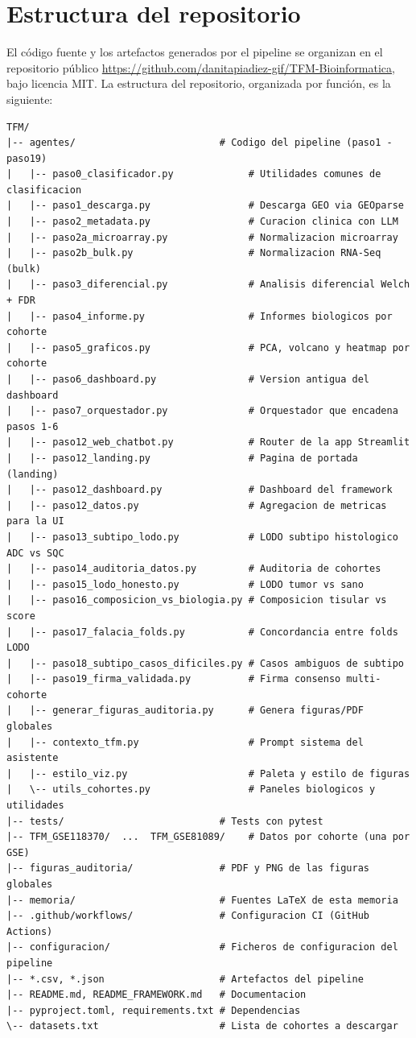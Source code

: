 \chapter{Estructura del repositorio}
\label{anexo:repo}

El código fuente y los artefactos generados por el pipeline se organizan
en el repositorio público
\url{https://github.com/danitapiadiez-gif/TFM-Bioinformatica}, bajo
licencia MIT. La estructura del repositorio, organizada por función, es
la siguiente:

\begin{lstlisting}[style=bash, caption={Estructura completa del repositorio.}]
TFM/
|-- agentes/                         # Codigo del pipeline (paso1 - paso19)
|   |-- paso0_clasificador.py             # Utilidades comunes de clasificacion
|   |-- paso1_descarga.py                 # Descarga GEO via GEOparse
|   |-- paso2_metadata.py                 # Curacion clinica con LLM
|   |-- paso2a_microarray.py              # Normalizacion microarray
|   |-- paso2b_bulk.py                    # Normalizacion RNA-Seq (bulk)
|   |-- paso3_diferencial.py              # Analisis diferencial Welch + FDR
|   |-- paso4_informe.py                  # Informes biologicos por cohorte
|   |-- paso5_graficos.py                 # PCA, volcano y heatmap por cohorte
|   |-- paso6_dashboard.py                # Version antigua del dashboard
|   |-- paso7_orquestador.py              # Orquestador que encadena pasos 1-6
|   |-- paso12_web_chatbot.py             # Router de la app Streamlit
|   |-- paso12_landing.py                 # Pagina de portada (landing)
|   |-- paso12_dashboard.py               # Dashboard del framework
|   |-- paso12_datos.py                   # Agregacion de metricas para la UI
|   |-- paso13_subtipo_lodo.py            # LODO subtipo histologico ADC vs SQC
|   |-- paso14_auditoria_datos.py         # Auditoria de cohortes
|   |-- paso15_lodo_honesto.py            # LODO tumor vs sano
|   |-- paso16_composicion_vs_biologia.py # Composicion tisular vs score
|   |-- paso17_falacia_folds.py           # Concordancia entre folds LODO
|   |-- paso18_subtipo_casos_dificiles.py # Casos ambiguos de subtipo
|   |-- paso19_firma_validada.py          # Firma consenso multi-cohorte
|   |-- generar_figuras_auditoria.py      # Genera figuras/PDF globales
|   |-- contexto_tfm.py                   # Prompt sistema del asistente
|   |-- estilo_viz.py                     # Paleta y estilo de figuras
|   \-- utils_cohortes.py                 # Paneles biologicos y utilidades
|-- tests/                           # Tests con pytest
|-- TFM_GSE118370/  ...  TFM_GSE81089/    # Datos por cohorte (una por GSE)
|-- figuras_auditoria/               # PDF y PNG de las figuras globales
|-- memoria/                         # Fuentes LaTeX de esta memoria
|-- .github/workflows/               # Configuracion CI (GitHub Actions)
|-- configuracion/                   # Ficheros de configuracion del pipeline
|-- *.csv, *.json                    # Artefactos del pipeline
|-- README.md, README_FRAMEWORK.md   # Documentacion
|-- pyproject.toml, requirements.txt # Dependencias
\-- datasets.txt                     # Lista de cohortes a descargar
\end{lstlisting}


